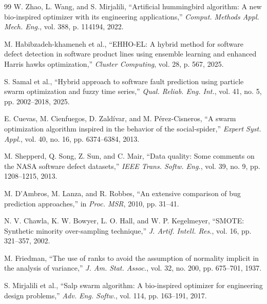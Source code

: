 \documentclass[conference,twocolumn]{IEEEtran}
\begin{document}
\begin{thebibliography}{99}
W. Zhao, L. Wang, and S. Mirjalili, ``Artificial hummingbird algorithm: A new bio-inspired optimizer with its engineering applications,'' \textit{Comput. Methods Appl. Mech. Eng.}, vol. 388, p. 114194, 2022.

M. Habibzadeh-khameneh et al., ``EHHO-EL: A hybrid method for software defect detection in software product lines using ensemble learning and enhanced Harris hawks optimization,'' \textit{Cluster Computing}, vol. 28, p. 567, 2025.

S. Samal et al., ``Hybrid approach to software fault prediction using particle swarm optimization and fuzzy time series,'' \textit{Qual. Reliab. Eng. Int.}, vol. 41, no. 5, pp. 2002--2018, 2025.

E. Cuevas, M. Cienfuegos, D. Zald\'{i}var, and M. P\'{e}rez-Cisneros, ``A swarm optimization algorithm inspired in the behavior of the social-spider,'' \textit{Expert Syst. Appl.}, vol. 40, no. 16, pp. 6374--6384, 2013.

M. Shepperd, Q. Song, Z. Sun, and C. Mair, ``Data quality: Some comments on the NASA software defect datasets,'' \textit{IEEE Trans. Softw. Eng.}, vol. 39, no. 9, pp. 1208--1215, 2013.

M. D'Ambros, M. Lanza, and R. Robbes, ``An extensive comparison of bug prediction approaches,'' in \textit{Proc. MSR}, 2010, pp. 31--41.

N. V. Chawla, K. W. Bowyer, L. O. Hall, and W. P. Kegelmeyer, ``SMOTE: Synthetic minority over-sampling technique,'' \textit{J. Artif. Intell. Res.}, vol. 16, pp. 321--357, 2002.

M. Friedman, ``The use of ranks to avoid the assumption of normality implicit in the analysis of variance,'' \textit{J. Am. Stat. Assoc.}, vol. 32, no. 200, pp. 675--701, 1937.

S. Mirjalili et al., ``Salp swarm algorithm: A bio-inspired optimizer for engineering design problems,'' \textit{Adv. Eng. Softw.}, vol. 114, pp. 163--191, 2017.

\end{thebibliography}
\end{document}
